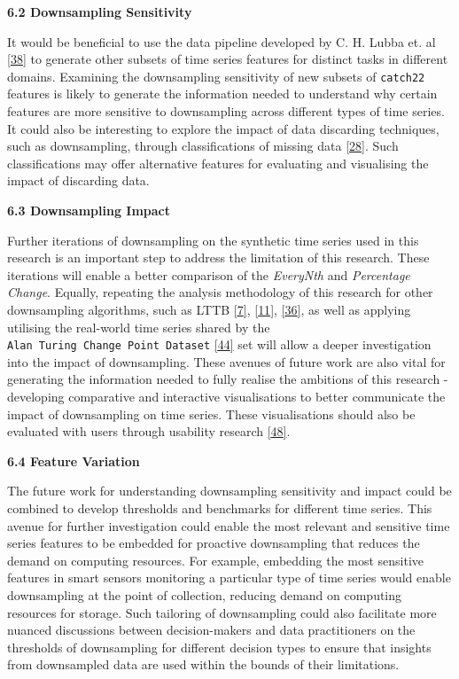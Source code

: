 \documentclass{article}
\begin{document}
\textbf{6.2 Downsampling Sensitivity}

It would be beneficial to use the data pipeline developed by C. H. Lubba
et. al \protect\hyperlink{ref-catch22}{{[}38{]}} to generate other
subsets of time series features for distinct tasks in different domains.
Examining the downsampling sensitivity of new subsets of
\texttt{catch22} features is likely to generate the information needed
to understand why certain features are more sensitive to downsampling
across different types of time series. It could also be interesting to
explore the impact of data discarding techniques, such as downsampling,
through classifications of missing data
\protect\hyperlink{ref-missingdata}{{[}28{]}}. Such classifications may
offer alternative features for evaluating and visualising the impact of
discarding data.

\textbf{6.3 Downsampling Impact}

Further iterations of downsampling on the synthetic time series used in
this research is an important step to address the limitation of this
research. These iterations will enable a better comparison of the
\emph{EveryNth} and \emph{Percentage Change}. Equally, repeating the
analysis methodology of this research for other downsampling algorithms,
such as LTTB \protect\hyperlink{ref-MinMaxLTTB}{{[}7{]}},
\protect\hyperlink{ref-Sveinn}{{[}11{]}},
\protect\hyperlink{ref-MinMaxOrdered}{{[}36{]}}, as well as applying
utilising the real-world time series shared by the
\texttt{Alan\ Turing\ Change\ Point\ Dataset}
\protect\hyperlink{ref-ATIChangePoint}{{[}44{]}} set will allow a deeper
investigation into the impact of downsampling. These avenues of future
work are also vital for generating the information needed to fully
realise the ambitions of this research - developing comparative and
interactive visualisations to better communicate the impact of
downsampling on time series. These visualisations should also be
evaluated with users through usability research
\protect\hyperlink{ref-graphsampling}{{[}48{]}}.

\textbf{6.4 Feature Variation}

The future work for understanding downsampling sensitivity and impact
could be combined to develop thresholds and benchmarks for different
time series. This avenue for further investigation could enable the most
relevant and sensitive time series features to be embedded for proactive
downsampling that reduces the demand on computing resources. For
example, embedding the most sensitive features in smart sensors
monitoring a particular type of time series would enable downsampling at
the point of collection, reducing demand on computing resources for
storage. Such tailoring of downsampling could also facilitate more
nuanced discussions between decision-makers and data practitioners on
the thresholds of downsampling for different decision types to ensure
that insights from downsampled data are used within the bounds of their
limitations.
\end{document}
